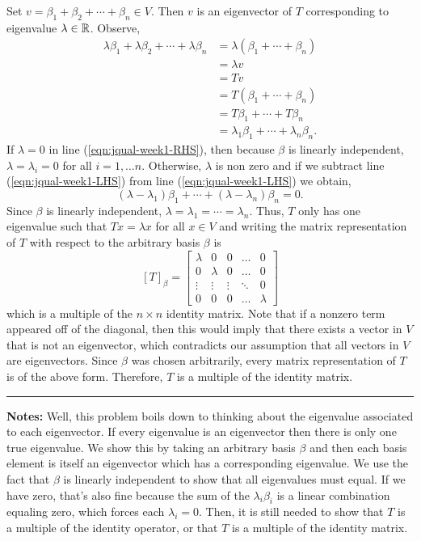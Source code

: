 \documentclass{article}
\begin{document}
Set $v = \beta_1 + \beta_2 + \cdots + \beta_n\in V$. Then $v$ is an eigenvector of $T$ corresponding to
 eigenvalue $\lambda\in\mathbb R$. Observe,
 	\begin{align}
		\lambda \beta_1 + \lambda \beta_2 + \cdots + \lambda \beta_n 
			& = \lambda(\beta_1+\cdots+\beta_n) \label{eqn:jqual-week1-RHS}\\
			& = \lambda v \nonumber \\
			& = Tv \nonumber \\
			& = T(\beta_1+\cdots+\beta_n) \nonumber \\
			& = T\beta_1 + \cdots + T\beta_n \nonumber \\
			& =  \lambda_1 \beta_1 + \cdots + \lambda_n \beta_n .\label{eqn:jqual-week1-LHS}
	\end{align}
If $\lambda = 0$ in line (\ref{eqn:jqual-week1-RHS}), then because $\beta$ is linearly independent, 
$\lambda = \lambda_i = 0$ for all $i = 1,\dots n$. Otherwise, $\lambda$ is non zero and if we subtract
 line  (\ref{eqn:jqual-week1-LHS}) from line (\ref{eqn:jqual-week1-LHS}) we obtain,
 	\[ (\lambda - \lambda_1) \beta_1 + \cdots + (\lambda - \lambda_n) \beta_n = 0.\]
Since $\beta$ is linearly independent, $\lambda = \lambda_1=\cdots = \lambda_n$. Thus, $T$ only has one eigenvalue such that $Tx = \lambda x$ for all $x\in V$ and writing the matrix representation of $T$ with respect to the arbitrary basis $\beta$ is 
	\[ [T]_\beta = \begin{bmatrix} 
				\lambda & 0  & 0  & \dots & 0 \\
				0 & \lambda & 0 & \dots & 0\\
				\vdots & \vdots & \vdots & \ddots & 0\\
				0 & 0 & 0 & \dots & \lambda 
				\end{bmatrix}\]
which is a multiple of the $n\times n$ identity matrix. Note that if a nonzero term appeared off of the diagonal, then this would imply that there exists a vector in $V$ that is not an eigenvector, which contradicts our assumption that all vectors in $V$ are eigenvectors. Since $\beta$ was chosen arbitrarily, every matrix representation of $T$ is of the above form. Therefore, $T$ is a multiple of the identity matrix. \\

\hrule 

\textbf{Notes:} Well, this problem boils down to thinking about the eigenvalue associated to each eigenvector. If every eigenvalue is an eigenvector then there is only one true eigenvalue. We show this by taking an arbitrary basis $\beta$ and then each basis element is itself an eigenvector which has a corresponding eigenvalue. We use the fact that $\beta$ is linearly independent to show that all eigenvalues must equal. If we have zero, that's also fine because the sum of the $\lambda_i \beta_i$ is a linear combination equaling zero, which forces each $\lambda_i = 0$. Then, it is still needed to show that $T$ is a multiple of the identity operator, or that $T$ is a multiple of the identity matrix.\\
\end{document}
